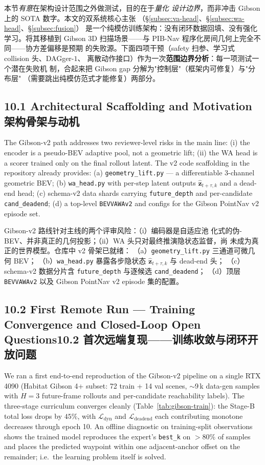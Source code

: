 \documentclass[11pt,a4paper]{article}
\newcommand{\en}[1]{\par\noindent #1\par\vspace{0.15em}}
\newcommand{\zh}[1]{\par\noindent\color{zhcol}\hspace{0.5em}#1\par\color{black}\vspace{0.6em}}
\newcommand{\bisubsec}[2]{\subsection[#1]{#1\quad\normalfont\small\color{zhcol}\textsf{#2}}}
\newcommand{\bz}{\mathbf{z}}
\begin{document}
\zh{\textsf{本节\emph{有意}在架构设计范围之外做测试，目的在于\emph{量化
设计边界}，而非冲击 Gibson 上的 SOTA 数字。本文的双系统核心主张
（\S\ref{subsec:va-head}、\S\ref{subsec:wa-head}、\S\ref{subsec:fusion}）
是一个纯模仿训练架构：没有闭环数据回填、没有强化学习。将其移植到 Gibson
3D 扫描场景——与 PIB-Nav 程序化房间几何上完全不同——协方差偏移是预期
的失败源。下面四项干预（safety 扫参、学习式 collision 头、DAGger-$1$、
离散动作接口）作为一次\textbf{范围边界分析}：每一项测试一个潜在失败机
制，合起来把 Gibson gap 分解为"控制层"（框架内可修复）与"分布层"
（需要跳出纯模仿范式才能修复）两部分。}}

\bisubsec{10.1 Architectural Scaffolding and Motivation}{架构骨架与动机}

\en{The Gibson-v2 path addresses two reviewer-level risks in the main
line: (i) the encoder is a pseudo-BEV adaptive pool, not a geometric lift;
(ii) the WA head is a scorer trained only on the final rollout latent.
The v2 code scaffolding in the repository already provides:
(a) \texttt{geometry\_lift.py} — a differentiable $3$-channel geometric
BEV; (b) \texttt{wa\_head.py} with per-step latent outputs
$\hat{\bz}_{t+\tau,k}$ and a dead-end head; (c) schema-v2 data shards
carrying \texttt{future\_depth} and per-candidate \texttt{cand\_deadend};
(d) a top-level \texttt{BEVVAWAv2} and configs for the Gibson PointNav v2
episode set.}

\zh{\textsf{Gibson-v2 路线针对主线的两个评审风险：（i）编码器是自适应池
化式的伪-BEV、并非真正的几何投影；（ii）WA 头只对最终推演隐状态监督，尚
未成为真正的世界模型。仓库中 v2 骨架已就绪：
（a）\texttt{geometry\_lift.py} 三通道可微几何 BEV；
（b）\texttt{wa\_head.py} 暴露各步隐状态 $\hat{\bz}_{t+\tau,k}$ 与
dead-end 头；
（c）schema-v2 数据分片含 \texttt{future\_depth} 与逐候选
\texttt{cand\_deadend}；
（d）顶层 \texttt{BEVVAWAv2} 以及 Gibson PointNav v2 episode 集的配置。}}

\bisubsec{10.2 First Remote Run — Training Convergence and Closed-Loop Open Questions}
{10.2 首次远端复现——训练收敛与闭环开放问题}

\en{We ran a first end-to-end reproduction of the Gibson-v2 pipeline on a
single RTX 4090 (Habitat Gibson 4+ subset: 72 train + 14 val scenes,
$\sim$9\,k data-gen samples with $H{=}3$ future-frame rollouts and
per-candidate reachability labels). The three-stage curriculum converges
cleanly (Table~\ref{tab:gibson-train}): the Stage-B total loss drops by
$45\%$, with $\mathcal{L}_{\mathrm{dyn}}$ and $\mathcal{L}_{\mathrm{deadend}}$
each contributing monotone decreases through epoch 10. An offline
diagnostic on training-split observations shows the trained model
reproduces the expert's \texttt{best\_k} on $>80\%$ of samples and places
the predicted waypoint within one adjacent-anchor offset on the
remainder; i.e.\ the learning problem itself is solved.}
\end{document}
